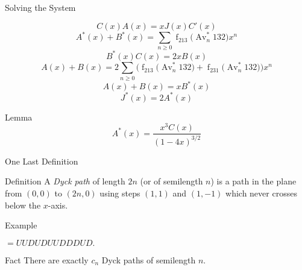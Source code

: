 \documentclass{beamer}
\DeclareMathOperator{\num}{f}
\DeclareMathOperator{\Av}{Av}
\begin{document}
\begin{frame}{Solving the System}
  \begin{block}{}
    \pause
    $$ C(x) A(x)  = xJ(x) C'(x)$$
    $$ A^*(x) + B^*(x) = \sum_{n\geq 0} \num_{213} \big(\Av_n^* 132
    \big) x^n $$ 
    $$ B^*(x) C(x) = 2xB(x) $$
    $$ A(x)+B(x) = 2\sum_{n\geq 0} \Big(\num_{213} \big( \Av ^*_n
    132 \big) + \num_{231} \big( \Av ^*_n 132 \big)\Big) x^n $$
    $$ A(x) + B(x) = xB^*(x) $$
    $$ J^*(x)  = 2A^*(x) $$
  \end{block}
\end{frame}


\begin{frame}

  \begin{block}{Lemma}
    $$A^*(x) = \frac{x^3C(x)}{(1-4x)^{3/2}}$$
  \end{block}

\end{frame}


\begin{frame}{One Last Definition}
  \pause
  
  \begin{block}{Definition}
    A \emph{Dyck path} of length $2n$ (or of semilength $n$) is a
    path in the plane from $(0,0)$ to $(2n,0)$ using steps $(1,1)$ and
    $(1,-1)$ which never crosses below the $x$-axis. 
  \end{block}
  \pause 

  \begin{block}{Example}
      $ = UUDUDUUDDDUD.$
  \end{block}
  \pause

  \begin{block}{Fact}
    There are exactly $c_n$ Dyck paths of semilength $n$.   
  \end{block}

\end{frame}
\end{document}
